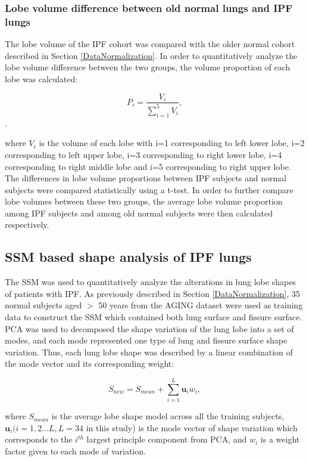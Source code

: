 \subsubsection{Lobe volume difference between old normal lungs and IPF lungs}
The lobe volume of the IPF cohort was compared with the older normal cohort described in Section \ref{DataNormalization}. In order to quantitatively analyze the lobe volume difference between the two groups, the volume proportion of each lobe was calculated:

\begin{equation}
 \label{eq:FissurePrediction1}
 P_{i} = \frac{V_{i}}{\sum_{i=1}^{5}V_i},
\end{equation}. 

\noindent where $V_{i}$ is the volume of each lobe with i=1 corresponding to left lower lobe, i=2 corresponding to left upper lobe, i=3 corresponding to right lower lobe, i=4 corresponding to right middle lobe and i=5 corresponding to right upper lobe. The differences in lobe volume proportions between IPF subjects and normal subjects were compared statistically using a t-test. In order to further compare lobe volumes between these two groups, the average lobe volume proportion among IPF subjects and among old normal subjects were then calculated respectively.

\subsection{SSM based shape analysis of IPF lungs} \label{SSMBasedAnalysis}
The SSM was used to quantitatively analyze the alterations in lung lobe shapes of patients with IPF. As previously described in Section \ref{DataNormalization}, 35 normal subjects aged $>$ 50 years from the AGING dataset were used as training data to construct the SSM which contained both lung surface and fissure surface. PCA was used to decomposed the shape variation of the lung lobe into a set of modes, and each mode represented one type of lung and fissure surface shape variation. Thus, each lung lobe shape was described by a linear combination of the mode vector and its corresponding weight:

\begin{equation}
 \label{eq:FissurePrediction1}
 S_{new} = S_{mean} + \sum_{i=1}^L \mathbf{u}_i w_{i},
\end{equation}

\noindent where $S_{mean}$ is the average lobe shape model across all the training subjects, $\mathbf{u}_i (i = 1,2...L, L=34$ in this study) is the mode vector of shape variation which corresponds to the $i^{th}$ largest principle component from PCA, and $w_{i}$ is a weight factor given to each mode of variation. 

